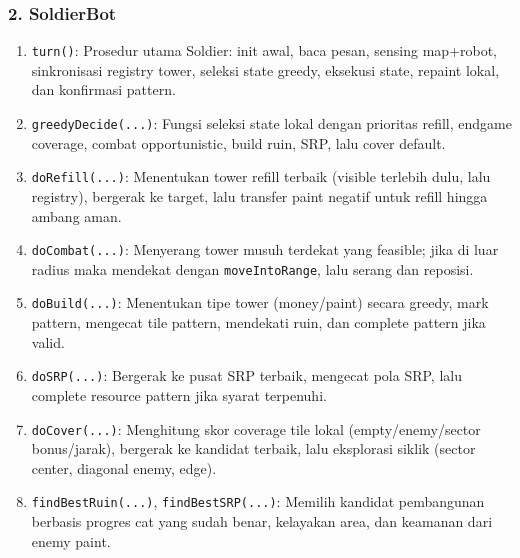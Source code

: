 \subsubsection{2. SoldierBot}
\begin{enumerate}
	\item \texttt{turn()}:
	      Prosedur utama Soldier: init awal, baca pesan, sensing map+robot, sinkronisasi registry tower, seleksi state greedy, eksekusi state, repaint lokal, dan konfirmasi pattern.

	\item \texttt{greedyDecide(...)}:
	      Fungsi seleksi state lokal dengan prioritas refill, endgame coverage, combat opportunistic, build ruin, SRP, lalu cover default.

	\item \texttt{doRefill(...)}:
	      Menentukan tower refill terbaik (visible terlebih dulu, lalu registry), bergerak ke target, lalu transfer paint negatif untuk refill hingga ambang aman.

	\item \texttt{doCombat(...)}:
	      Menyerang tower musuh terdekat yang feasible; jika di luar radius maka mendekat dengan \texttt{moveIntoRange}, lalu serang dan reposisi.

	\item \texttt{doBuild(...)}:
	      Menentukan tipe tower (money/paint) secara greedy, mark pattern, mengecat tile pattern, mendekati ruin, dan complete pattern jika valid.

	\item \texttt{doSRP(...)}:
	      Bergerak ke pusat SRP terbaik, mengecat pola SRP, lalu complete resource pattern jika syarat terpenuhi.

	\item \texttt{doCover(...)}:
	      Menghitung skor coverage tile lokal (empty/enemy/sector bonus/jarak), bergerak ke kandidat terbaik, lalu eksplorasi siklik (sector center, diagonal enemy, edge).

	\item \texttt{findBestRuin(...)}, \texttt{findBestSRP(...)}:
	      Memilih kandidat pembangunan berbasis progres cat yang sudah benar, kelayakan area, dan keamanan dari enemy paint.
\end{enumerate}

